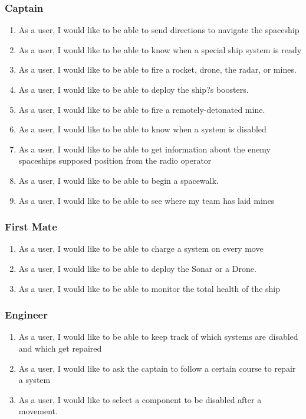 \subsubsection*{Captain}
\begin{enumerate}[resume, leftmargin=\listmargin]
\item As a user, I would like to be able to send directions to navigate the spaceship
\item As a user, I would like to be able to know when a special ship system is ready 
\item As a user, I would like to be able to fire a rocket, drone, the radar, or mines.
\item As a user, I would like to be able to deploy the ship?s boosters.
\item As a user, I would like to be able to fire a remotely-detonated mine.
\item As a user, I would like to be able to know when a system is disabled
\item As a user, I would like to be able to get information about the enemy spaceships supposed position from the radio operator
\item As a user, I would like to be able to begin a spacewalk.
\item As a user, I would like to be able to see where my team has laid mines
\end{enumerate}
\subsubsection*{First Mate}
\begin{enumerate}[resume, leftmargin=\listmargin]
\item As a user, I would like to be able to charge a system on every move
\item As a user, I would like to be able to deploy the Sonar or a Drone.
\item As a user, I would like to be able to monitor the total health of the ship
\end{enumerate}
\subsubsection*{Engineer}
\begin{enumerate}[resume, leftmargin=\listmargin]
\item As a user, I would like to be able to keep track of which systems are disabled and which get repaired
\item As a user, I would like to ask the captain to follow a certain course to repair a system
\item As a user, I would like to select a component to be disabled after a movement.
\end{enumerate}
